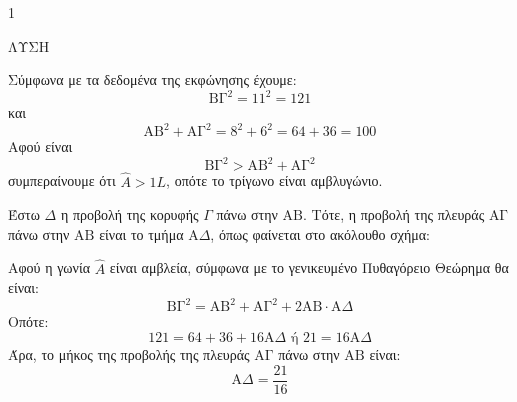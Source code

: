 \begin{ylh}{1}
    \item [Ύλη από εικόνα]
\end{ylh}

ΛΥΣΗ

\begin{alist}
\item[α)] Σύμφωνα με τα δεδομένα της εκφώνησης έχουμε:
    \[ \text{ΒΓ}^2 = 11^2 = 121 \]
    και
    \[ \text{ΑΒ}^2 + \text{ΑΓ}^2 = 8^2 + 6^2 = 64 + 36 = 100 \]
    Αφού είναι
    \[ \text{ΒΓ}^2 > \text{ΑΒ}^2 + \text{ΑΓ}^2 \]
    συμπεραίνουμε ότι $\hat{A} > 1L$, οπότε το τρίγωνο είναι αμβλυγώνιο.
\item[β)] Έστω $\Delta$ η προβολή της κορυφής $\Gamma$ πάνω στην $\text{ΑΒ}$. Τότε, η προβολή της πλευράς $\text{ΑΓ}$ πάνω στην $\text{ΑΒ}$ είναι το τμήμα $\text{Α}\Delta$, όπως φαίνεται στο ακόλουθο σχήμα:
    \begin{figure} %
        \centering
    \end{figure}
    Αφού η γωνία $\hat{A}$ είναι αμβλεία, σύμφωνα με το γενικευμένο Πυθαγόρειο Θεώρημα θα είναι:
    \[ \text{ΒΓ}^2 = \text{ΑΒ}^2 + \text{ΑΓ}^2 + 2\text{ΑΒ} \cdot \text{Α}\Delta \]
    Οπότε:
    \[ 121 = 64 + 36 + 16\text{Α}\Delta \text{ ή } 21 = 16\text{Α}\Delta \]
    Άρα, το μήκος της προβολής της πλευράς $\text{ΑΓ}$ πάνω στην $\text{ΑΒ}$ είναι:
    \[ \text{Α}\Delta = \frac{21}{16} \]
\end{alist}